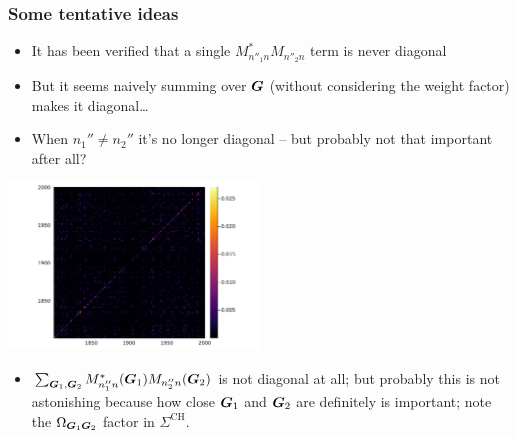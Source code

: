 \documentclass[t]{beamer}
\begin{document}
\begin{frame}[allowframebreaks]
\frametitle{Some tentative ideas}

\begin{itemize}
    \item It has been verified that a single $M_{n''_1 n}^* M_{n''_2 n}$ term is never diagonal
    \item But it seems naively summing over $\vb*{G}$ (without considering the weight factor)
    makes it diagonal\dots
    \item When $n_1'' \neq n_2''$ it's no longer diagonal -- 
        but probably not that important after all?
\end{itemize}    

\begin{center}
    \includegraphics[width=0.5\textwidth]{../data/sigma/nc_range-1800-2000-n_idx-120-n_prime_idx_120-k_idx-1-q_idx-1-G_range-200-250.png}
\end{center}

\begin{itemize}
    \item $\sum_{\vb*{G}_1, \vb*{G}_2} M_{n''_1 n}^*(\vb*{G}_1) M_{n''_2 n}(\vb*{G}_2)$ is not diagonal at all; 
    but probably this is not astonishing because how close $\vb*{G}_1$ and $\vb*{G}_2$ are 
    definitely is important; note the $\Omega_{\vb*{G}_1 \vb*{G}_2}$ factor in $\Sigma^{\text{CH}}$.
\end{itemize}

\end{frame}
\end{document}
